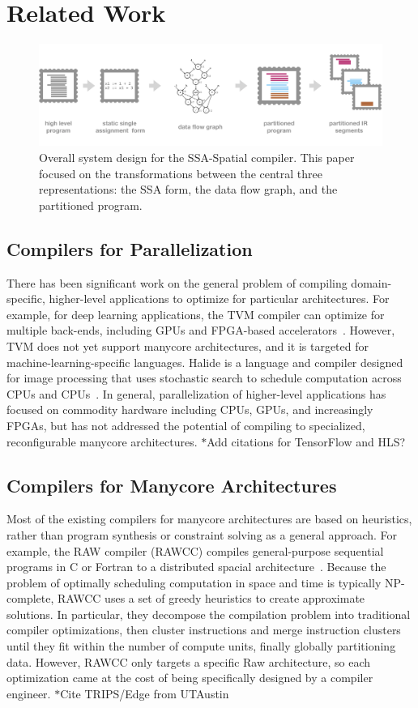 \documentclass{sig-alternate-05-2015}
\newcommand{\note}{\color{red}$*$}
\begin{document}
\section{Related Work}

\begin{figure}
\centering
\includegraphics[width=6.5in]{architecture-diagram.png}
\caption{Overall system design for the SSA-Spatial compiler. This paper focused on the transformations between the central three representations: the SSA form, the data flow graph, and the partitioned program.}
\label{fig:design}
\end{figure}

\subsection{Compilers for Parallelization}
There has been significant work on the general problem of compiling domain-specific, higher-level applications to optimize for particular architectures. For example, for deep learning applications, the TVM compiler can optimize for multiple back-ends, including GPUs and FPGA-based accelerators~\cite{tvm}. However, TVM does not yet support manycore architectures, and it is targeted for machine-learning-specific languages. Halide is a language and compiler designed for image processing that uses stochastic search to schedule computation across CPUs and CPUs~\cite{halide}. In general, parallelization of higher-level applications has focused on commodity hardware including CPUs, GPUs, and increasingly FPGAs, but has not addressed the potential of compiling to specialized, reconfigurable manycore architectures. 
{\note Add citations for TensorFlow and HLS?}

\subsection{Compilers for Manycore Architectures}
Most of the existing compilers for manycore architectures are based on heuristics, rather than program synthesis or constraint solving as a general approach. For example, the RAW compiler (RAWCC) compiles general-purpose sequential programs in C or Fortran to a distributed spacial architecture~\cite{raw}. Because the problem of optimally scheduling computation in space and time is typically NP-complete, RAWCC uses a set of greedy heuristics to create approximate solutions. In particular, they decompose the compilation problem into traditional compiler optimizations, then cluster instructions and merge instruction clusters until they fit within the number of compute units, finally globally partitioning data. However, RAWCC only targets a specific Raw architecture, so each optimization came at the cost of being specifically designed by a compiler engineer. 
{\note Cite TRIPS/Edge from UTAustin}
\end{document}
